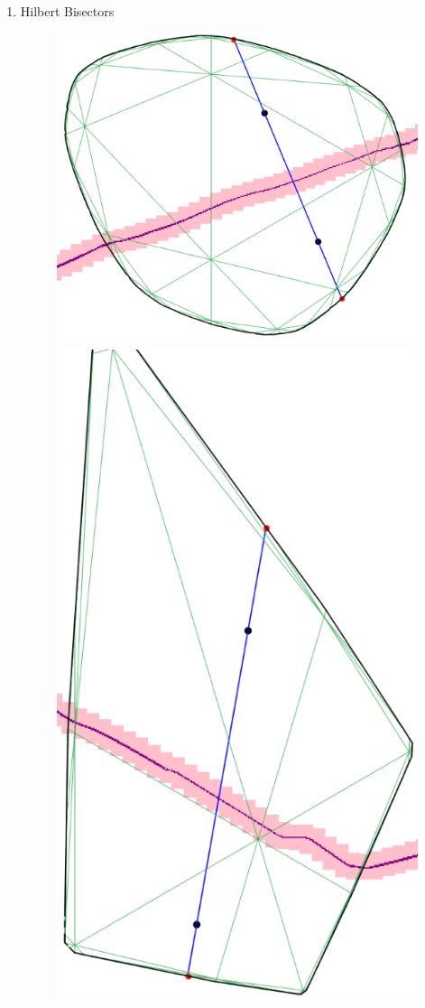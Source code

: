 \documentclass[12pt]{article}%
\begin{document}
\begin{enumerate}
\begin{figure}[H]
		\end{figure}
	\item Hilbert Bisectors
		\begin{figure}[H]
			\centering
			\includegraphics[scale=0.25]{mild_deformation.png}
			\includegraphics[scale=0.25]{extreme_deformation1.png}

\end{figure}
\end{enumerate}
\end{document}
